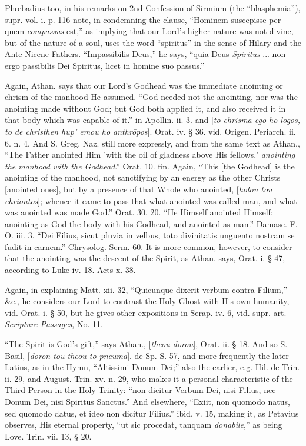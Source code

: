 Phœbadius too, in his remarks on 2nd Confession
of Sirmium (the ``blasphemia''), supr. vol. i. p. 116 note, in
condemning the clause, ``Hominem suscepisse per quem \emph{compassus}
est,'' as implying that our Lord's higher nature was not divine, but of
the nature of a soul, uses the word ``spiritus'' in the sense of
Hilary and the Ante-Nicene Fathers. ``Impassibilis Deus,'' he says, ``quia
Deus \emph{Spiritus} ... non ergo passibilis Dei Spiritus, licet in
homine suo passus.''

Again, Athan. says that our Lord's Godhead was
the immediate anointing or chrism of the manhood He assumed. ``God
needed not the anointing, nor was the anointing made without God; but
God both applied it, and also received it in that body which was
capable of it.'' in Apollin. ii. 3. and [\emph{to chrisma eg\={o} ho
logos, to de christhen hup'
emou ho anthr\={o}pos}]. Orat. iv. § 36. vid. Origen.
Periarch. ii. 6. n. 4. And S. Greg. Naz. still more expressly, and
from the same text as Athan., ``The Father anointed Him 'with the oil
of gladness above His fellows,' \emph{anointing the manhood with the
Godhead}.'' Orat. 10. fin. Again, ``This [the Godhead] is the
anointing of the manhood, not sanctifying by an energy as the other
Christs [anointed ones], but by a presence of that Whole who anointed,
[\emph{holou tou chriontos}]; whence it came to pass that what
anointed was called man, and what was anointed was made God.'' Orat.
30. 20. ``He Himself anointed Himself; anointing as God the body with
his Godhead, and anointed as man.'' Damasc. F. O. iii. 3. ``Dei Filius,
sicut pluvia in velbus, toto divinitatis unguento nostram se fudit in
carnem.'' Chrysolog. Serm. 60. It is more common, however, to consider
that the anointing was the descent of the Spirit, as Athan. says, Orat.
i. § 47, according to Luke iv. 18. Acts x. 38.

Again, in explaining Matt. xii. 32, ``Quicunque
dixerit verbum contra Filium,'' \&c., he considers our Lord to
contrast the Holy Ghost with His own humanity, vid. Orat. i. § 50,
but he gives other expositions in Serap. iv. 6, vid. supr. art. \emph{Scripture
Passages}, No. 11.

``The Spirit is God's gift,'' says Athan., [\emph{theou
d\={o}ron}], Orat. ii. § 18. And so S. Basil, [\emph{d\={o}ron
tou theou to pneuma}]. de Sp. S. 57, and more frequently the later
Latins, as in the Hymn, ``Altissimi Donum Dei;'' also the earlier, e.g.
Hil. de Trin. ii. 29, and August. Trin. xv. n. 29, who makes it a
personal characteristic of the Third Person in the Holy Trinity: ``non
dicitur Verbum Dei, nisi Filius, nec Donum Dei, nisi Spiritus Sanctus.''
And elsewhere, ``Exiit, non quomodo natus, sed quomodo datus, et ideo
non dicitur Filius.'' ibid. v. 15, making it, as Petavius observes, His
eternal property, ``ut sic procedat, tanquam \emph{donabile},'' as being
Love. Trin. vii. 13, § 20.

